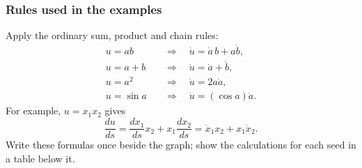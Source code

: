 \subsubsection*{Rules used in the examples}
Apply the ordinary sum, product and chain rules:
\[
\begin{aligned}
 u=ab &\quad\Longrightarrow\quad \dot u=\dot a\,b+a\dot b,\\
 u=a+b &\quad\Longrightarrow\quad \dot u=\dot a+\dot b,\\
 u=a^2 &\quad\Longrightarrow\quad \dot u=2a\dot a,\\
 u=\sin a &\quad\Longrightarrow\quad \dot u=(\cos a)\dot a.
\end{aligned}
\]
For example, $u=x_1x_2$ gives
\[
\frac{du}{ds}=\frac{dx_1}{ds}x_2+x_1\frac{dx_2}{ds}
=\dot x_1x_2+x_1\dot x_2.
\]
Write these formulas once beside the graph; show the calculations for each seed in a table below it.

